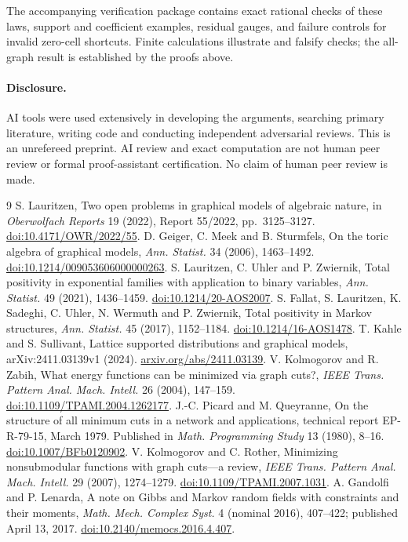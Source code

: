 \documentclass[11pt]{article}
\begin{document}
The accompanying verification package contains exact rational checks of these laws, support and coefficient examples, residual gauges, and failure controls for invalid zero-cell shortcuts. Finite calculations illustrate and falsify checks; the all-graph result is established by the proofs above.

\paragraph{Disclosure.} AI tools were used extensively in developing the arguments, searching primary literature, writing code and conducting independent adversarial reviews. This is an unrefereed preprint. AI review and exact computation are not human peer review or formal proof-assistant certification. No claim of human peer review is made.

\begin{thebibliography}{9}
 S. Lauritzen, Two open problems in graphical models of algebraic nature, in \emph{Oberwolfach Reports} 19 (2022), Report 55/2022, pp.~3125--3127. \href{https://doi.org/10.4171/OWR/2022/55}{doi:10.4171/OWR/2022/55}.
 D. Geiger, C. Meek and B. Sturmfels, On the toric algebra of graphical models, \emph{Ann. Statist.} 34 (2006), 1463--1492. \href{https://doi.org/10.1214/009053606000000263}{doi:10.1214/009053606000000263}.
 S. Lauritzen, C. Uhler and P. Zwiernik, Total positivity in exponential families with application to binary variables, \emph{Ann. Statist.} 49 (2021), 1436--1459. \href{https://doi.org/10.1214/20-AOS2007}{doi:10.1214/20-AOS2007}.
 S. Fallat, S. Lauritzen, K. Sadeghi, C. Uhler, N. Wermuth and P. Zwiernik, Total positivity in Markov structures, \emph{Ann. Statist.} 45 (2017), 1152--1184. \href{https://doi.org/10.1214/16-AOS1478}{doi:10.1214/16-AOS1478}.
 T. Kahle and S. Sullivant, Lattice supported distributions and graphical models, arXiv:2411.03139v1 (2024). \href{https://arxiv.org/abs/2411.03139}{arxiv.org/abs/2411.03139}.
 V. Kolmogorov and R. Zabih, What energy functions can be minimized via graph cuts?, \emph{IEEE Trans. Pattern Anal. Mach. Intell.} 26 (2004), 147--159. \href{https://doi.org/10.1109/TPAMI.2004.1262177}{doi:10.1109/TPAMI.2004.1262177}.
 J.-C. Picard and M. Queyranne, On the structure of all minimum cuts in a network and applications, technical report EP-R-79-15, March 1979. Published in \emph{Math. Programming Study} 13 (1980), 8--16. \href{https://doi.org/10.1007/BFb0120902}{doi:10.1007/BFb0120902}.
 V. Kolmogorov and C. Rother, Minimizing nonsubmodular functions with graph cuts---a review, \emph{IEEE Trans. Pattern Anal. Mach. Intell.} 29 (2007), 1274--1279. \href{https://doi.org/10.1109/TPAMI.2007.1031}{doi:10.1109/TPAMI.2007.1031}.
 A. Gandolfi and P. Lenarda, A note on Gibbs and Markov random fields with constraints and their moments, \emph{Math. Mech. Complex Syst.} 4 (nominal 2016), 407--422; published April 13, 2017. \href{https://doi.org/10.2140/memocs.2016.4.407}{doi:10.2140/memocs.2016.4.407}.
\end{thebibliography}
\end{document}
